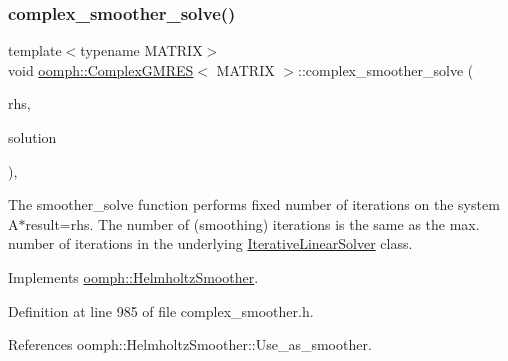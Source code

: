 \subsubsection{\texorpdfstring{complex\+\_\+smoother\+\_\+solve()}{complex\_smoother\_solve()}}
{\footnotesize\ttfamily template$<$typename M\+A\+T\+R\+IX$>$ \\
void \hyperlink{classoomph_1_1ComplexGMRES}{oomph\+::\+Complex\+G\+M\+R\+ES}$<$ M\+A\+T\+R\+IX $>$\+::complex\+\_\+smoother\+\_\+solve (\begin{DoxyParamCaption}\item[{const \hyperlink{classoomph_1_1Vector}{Vector}$<$ \hyperlink{classoomph_1_1DoubleVector}{Double\+Vector} $>$ \&}]{rhs,  }\item[{\hyperlink{classoomph_1_1Vector}{Vector}$<$ \hyperlink{classoomph_1_1DoubleVector}{Double\+Vector} $>$ \&}]{solution }\end{DoxyParamCaption})\hspace{0.3cm}{\ttfamily [inline]}, {\ttfamily [virtual]}}



The smoother\+\_\+solve function performs fixed number of iterations on the system A$\ast$result=rhs. The number of (smoothing) iterations is the same as the max. number of iterations in the underlying \hyperlink{classoomph_1_1IterativeLinearSolver}{Iterative\+Linear\+Solver} class. 



Implements \hyperlink{classoomph_1_1HelmholtzSmoother_a8ec748270df3e1199f19ef267d5b8e85}{oomph\+::\+Helmholtz\+Smoother}.



Definition at line 985 of file complex\+\_\+smoother.\+h.



References oomph\+::\+Helmholtz\+Smoother\+::\+Use\+\_\+as\+\_\+smoother.

\mbox{\label{classoomph_1_1ComplexGMRES_a848721022a08fde4b2182a143f287ded}} 
